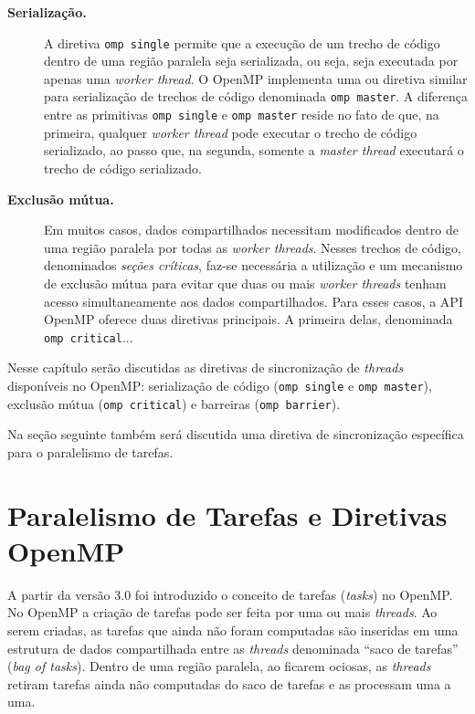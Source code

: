 \documentclass{SBCbookchapter}
\begin{document}
	\begin{description}
		\item[\textbf{Serialização.}] A diretiva \texttt{omp single} permite que a execução de um trecho
		de código dentro de uma região paralela seja serializada, ou seja, seja executada por apenas
		uma \textit{worker thread}. O OpenMP implementa uma ou diretiva similar para serialização
		de trechos de código denominada \texttt{omp master}. A diferença entre as primitivas \texttt{omp single}
		e \texttt{omp master} reside no fato de que, na primeira, qualquer \textit{worker thread} pode executar
		o trecho de código serializado, ao passo que, na segunda, somente a \textit{master thread} executará
		o trecho de código serializado.
		
		\item[\textbf{Exclusão mútua.}] Em muitos casos, dados compartilhados necessitam modificados dentro
		de uma região paralela por todas as \textit{worker threads}. Nesses trechos de código, denominados
		\textit{seções críticas}, faz-se necessária a utilização e um mecanismo de exclusão mútua para evitar
		que duas ou mais \textit{worker threads} tenham acesso simultaneamente aos dados compartilhados.
		Para esses casos, a API OpenMP oferece duas diretivas principais. A primeira delas, denominada
		\texttt{omp critical}...
	\end{description}
	
	Nesse capítulo serão discutidas as diretivas de sincronização de \textit{threads}
	disponíveis no OpenMP: serialização de código (\texttt{omp single} e
	\texttt{omp master}), exclusão mútua (\texttt{omp critical}) e barreiras
	(\texttt{omp barrier}).

	Na seção seguinte também será discutida uma diretiva de sincronização específica
	para o paralelismo de tarefas.

\section{Paralelismo de Tarefas e Diretivas OpenMP}

	A partir da versão 3.0 foi introduzido o conceito de tarefas (\textit{tasks}) no OpenMP.
	No OpenMP a criação de tarefas pode ser feita por uma ou mais \textit{threads}. Ao
	serem criadas, as tarefas que ainda não foram computadas são inseridas em uma
	estrutura de dados compartilhada entre as \textit{threads} denominada ``saco de tarefas''
	(\textit{bag of tasks}). Dentro de uma região paralela, ao ficarem ociosas, as \textit{threads}
	retiram tarefas ainda não computadas do saco de tarefas e as processam uma a uma.
	
\end{document}
